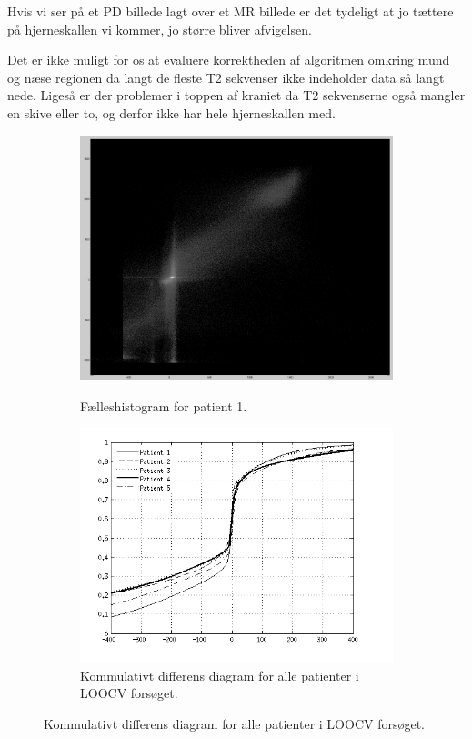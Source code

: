 Hvis vi ser på et PD billede lagt over et MR billede er det tydeligt at jo tættere på hjerneskallen vi kommer, jo større bliver afvigelsen.

Det er ikke muligt for os at evaluere korrektheden af algoritmen omkring mund og næse regionen da langt de fleste T2 sekvenser ikke indeholder data så langt nede. Ligeså er der problemer i toppen af kraniet da T2 sekvenserne også mangler en skive eller to, og derfor ikke har hele hjerneskallen med.

\begin{figure}
    \centering
    \begin{subfigure}[b]{0.47\textwidth}
    	\caption{Fælleshistogram for patient 1.}
        \includegraphics[width=1\textwidth]{billeder/loocv_joint_histogram.png}
        \label{fig:loocv_j_h}
    \end{subfigure}\hfill
    \begin{subfigure}[b]{0.47\textwidth}
        \caption{Kommulativt differens diagram for alle patienter i LOOCV forsøget.}
        \includegraphics[width=1\textwidth]{billeder/cumm_diff_loocv.png}

\end{subfigure}
\end{figure}
